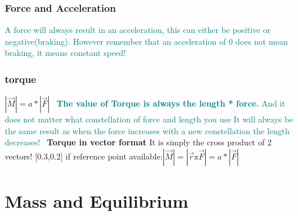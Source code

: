\documentclass[main.tex,fontsize=8pt,paper=a4,paper=portrait,DIV=calc,]{scrartcl}
\begin{document}
\begin{multicols*}{2}
\subsubsection{Force and Acceleration} 
\textcolor{teal}{A force will always result in an acceleration, this can either be positive or negative(braking).\newline
However remember that an acceleration of 0 does not mean braking, it means constant speed!}

\subsubsection{torque}
\Large \( |\vec{M}| = a * |\vec{F}| \)\newline
\, \newline
\textcolor{teal}{ \normalsize \textbf{The value of Torque is always the length * force.}\newline
And it does not matter what constellation of force and length you use\newline
It will always be the same result as when the force increases with a new constellation the length decreases!}\newline
\, \newline
\textbf{Torque in vector format}\newline
It is simply the cross product of 2 vectors!\newline
{}\newline
{}
{}[0.3,0.2]
\Large if reference point available:\newline \( |\vec{M}| = | \vec{r} \text{x} \vec{F} | = a * | \vec{F} | \ \)

\section{Mass and Equilibrium}


\end{multicols*}
\end{document}
